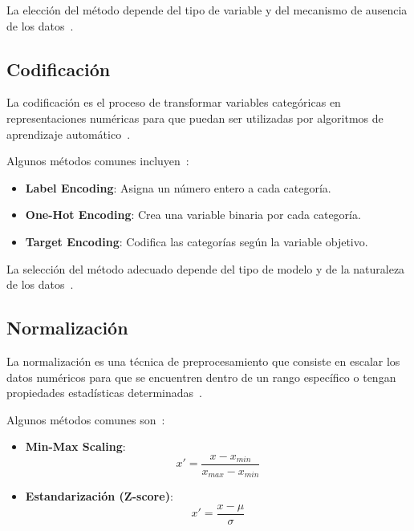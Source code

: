 \documentclass[12pt]{article}
\begin{document}
La elección del método depende del tipo de variable y del mecanismo de ausencia de los datos~\cite{little2019missing}.
\subsection{Codificación}

La codificación es el proceso de transformar variables categóricas en representaciones numéricas para que puedan ser utilizadas por algoritmos de aprendizaje automático~\cite{han2011data}.

Algunos métodos comunes incluyen~\cite{james2021introduction}:

\begin{itemize}
    \item \textbf{Label Encoding}: Asigna un número entero a cada categoría.
    \item \textbf{One-Hot Encoding}: Crea una variable binaria por cada categoría.
    \item \textbf{Target Encoding}: Codifica las categorías según la variable objetivo.
\end{itemize}

La selección del método adecuado depende del tipo de modelo y de la naturaleza de los datos~\cite{hastie2009elements}.
\subsection{Normalización}

La normalización es una técnica de preprocesamiento que consiste en escalar los datos numéricos para que se encuentren dentro de un rango específico o tengan propiedades estadísticas determinadas~\cite{han2011data}.

Algunos métodos comunes son~\cite{james2021introduction}:

\begin{itemize}
    \item \textbf{Min-Max Scaling}:
    \begin{equation}
    x' = \frac{x - x_{min}}{x_{max} - x_{min}}
    \end{equation}

    \item \textbf{Estandarización (Z-score)}:
    \begin{equation}
    x' = \frac{x - \mu}{\sigma}
    \end{equation}
\end{itemize}
\end{document}
